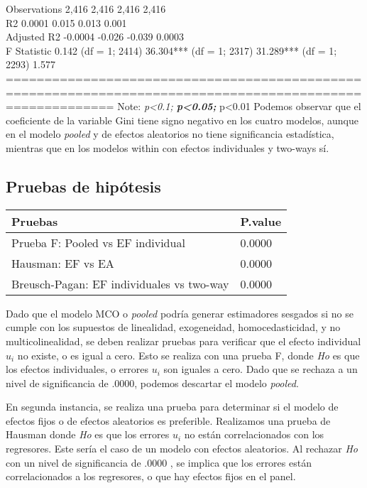 \documentclass[
  11pt,
]{article}
\begin{document}
Observations 2,416 2,416 2,416 2,416\\
R2 0.0001 0.015 0.013 0.001\\
Adjusted R2 -0.0004 -0.026 -0.039 0.0003\\
F Statistic 0.142 (df = 1; 2414) 36.304*** (df = 1; 2317) 31.289*** (df
= 1; 2293) 1.577\\
==========================================================================================================
Note: \emph{p\textless0.1; \textbf{p\textless0.05; }}p\textless0.01
Podemos observar que el coeficiente de la variable Gini tiene signo
negativo en los cuatro modelos, aunque en el modelo \emph{pooled} y de
efectos aleatorios no tiene significancia estadística, mientras que en
los modelos within con efectos individuales y two-ways sí.

\hypertarget{pruebas-de-hipuxf3tesis}{%
\subsection{Pruebas de hipótesis}\label{pruebas-de-hipuxf3tesis}}

\begin{table}[H]
\centering
\begin{tabular}{ll}
\toprule
Pruebas & P.value\\
\midrule
Prueba F: Pooled vs EF individual & 0.0000\\
Hausman: EF vs EA & 0.0000\\
Breusch-Pagan: EF individuales vs two-way & 0.0000\\
\bottomrule
\end{tabular}
\end{table}

Dado que el modelo MCO o \emph{pooled} podría generar estimadores
sesgados si no se cumple con los supuestos de linealidad, exogeneidad,
homocedasticidad, y no multicolinealidad, se deben realizar pruebas para
verificar que el efecto individual \(u_{i}\) no existe, o es igual a
cero. Esto se realiza con una prueba F, donde \emph{Ho} es que los
efectos individuales, o errores \(u_{i}\) son iguales a cero. Dado que
se rechaza a un nivel de significancia de .0000, podemos descartar el
modelo \emph{pooled}.

En segunda instancia, se realiza una prueba para determinar si el modelo
de efectos fijos o de efectos aleatorios es preferible. Realizamos una
prueba de Hausman donde \emph{Ho} es que los errores \(u_{i}\) no están
correlacionados con los regresores. Este sería el caso de un modelo con
efectos aleatorios. Al rechazar \emph{Ho} con un nivel de significancia
de .0000 , se implica que los errores están correlacionados a los
regresores, o que hay efectos fijos en el panel.
\end{document}

